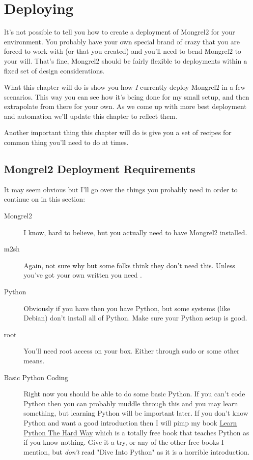 \chapter{Deploying}

It's not possible to tell you how to create a deployment of Mongrel2 for your
environment.  You probably have your own special brand of crazy that you are
forced to work with (or that you created) and you'll need to bend Mongrel2 to
your will.  That's fine, Mongrel2 should be fairly flexible to deployments
within a fixed set of design considerations.

What this chapter will do is show you how \emph{I} currently deploy Mongrel2 in
a few scenarios.  This way you can see how it's being done for my small setup,
and then extrapolate from there for your own.  As we come up with more best
deployment and automation we'll update this chapter to reflect them.

Another important thing this chapter will do is give you a set of recipes for
common thing you'll need to do at times.


\section{Mongrel2 Deployment Requirements}

It may seem obvious but I'll go over the things you probably need in order to
continue on in this section:

\begin{description}
\item [Mongrel2] I know, hard to believe, but you actually need to have Mongrel2 installed.
\item [m2sh] Again, not sure why but some folks think they don't need this.  Unless you've
    got your own written you need .
\item [Python] Obviously if you have  then you have Python, but some systems
    (like Debian) don't install all of Python.  Make sure your Python setup is good.
\item [root] You'll need root access on your box.  Either through sudo or some other means.
\item [Basic Python Coding] Right now you should be able to do some basic Python.  If you can't 
    code Python then you can probably muddle through this and you may learn something, but learning
    Python will be important later.  If you don't know Python and want a good introduction then I
    will pimp my book \href{http://learnpythonthehardway.org}{Learn Python The Hard Way} which is a
    totally free book that teaches Python as if you know nothing.  Give it a try, or any of the other
    free books I mention, but \emph{don't} read "Dive Into Python" as it is a horrible introduction.
\end{description}

